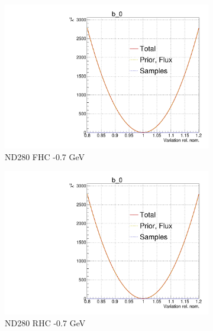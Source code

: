 \begin{figure}[!h]
\begin{subfigure}[t]{0.32\textwidth}
	\includegraphics[width=\textwidth, trim={0mm 0mm 0mm 11mm}, clip,page=18]{figures/mach3/Asimov/Full_LLHscan_18July_BeRPA_U_ND280logL_scan}
	\caption{ND280 FHC -0.7 GeV}
\end{subfigure}
\begin{subfigure}[t]{0.32\textwidth}
	\includegraphics[width=\textwidth, trim={0mm 0mm 0mm 11mm}, clip,page=45]{figures/mach3/Asimov/Full_LLHscan_18July_BeRPA_U_ND280logL_scan}
	\caption{ND280 RHC -0.7 GeV}
\end{subfigure}
\begin{subfigure}[t]{0.32\textwidth}

\end{subfigure}
\end{figure}
